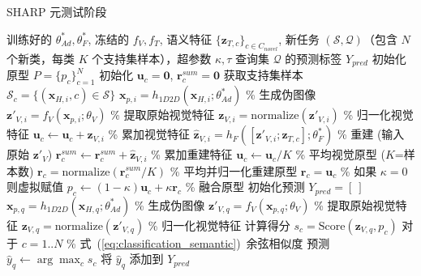 \begin{algorithm}[htbp]
\caption{SHARP 元测试阶段}
\label{alg:fsl_testing_sharp}
\begin{algorithmic}[1]
\REQUIRE 训练好的 $\theta_{Ad}^*, \theta_F^*$, 冻结的 $f_V, f_T$, 语义特征 $\{\mathbf{z}_{T,c}\}_{c \in C_{novel}}$, 新任务 $(\mathcal{S}, \mathcal{Q})$（包含 $N$ 个新类，每类 $K$ 个支持集样本），超参数 $\kappa, \tau$
\ENSURE 查询集 $\mathcal{Q}$ 的预测标签 $Y_{pred}$
\STATE 初始化原型 $P = \{ p_c \}_{c=1}^N$
    \STATE 初始化 $\mathbf{u}_c=\mathbf{0}$, $\mathbf{r}_c^{sum}=\mathbf{0}$
    \STATE 获取支持集样本 $\mathcal{S}_c = \{(\mathbf{x}_{H,i}, c) \in \mathcal{S}\}$
        \STATE $\mathbf{x}_{p,i} = h_{1D2D}(\mathbf{x}_{H,i}; \theta_{Ad}^*)$ \% 生成伪图像
        \STATE $\mathbf{z}'_{V,i} = f_V(\mathbf{x}_{p,i}; \theta_V)$          \% 提取原始视觉特征
        \STATE $\mathbf{z}_{V,i} = \text{normalize}(\mathbf{z}'_{V,i})$           \% 归一化视觉特征
        \STATE $\mathbf{u}_c \leftarrow \mathbf{u}_c + \mathbf{z}_{V,i}$             \% 累加视觉特征
            \STATE $\hat{\mathbf{z}}_{V,i} = h_F([\mathbf{z}'_{V,i}; \mathbf{z}_{T,c}]; \theta_F^*)$ \% 重建 (输入原始 $\mathbf{z}'_V$)
            \STATE $\mathbf{r}_c^{sum} \leftarrow \mathbf{r}_c^{sum} + \hat{\mathbf{z}}_{V,i}$ \% 累加重建特征
        \ENDIF
    \ENDFOR %
    \STATE $\mathbf{u}_c \leftarrow \mathbf{u}_c / K$                     \% 平均视觉原型 ($K$=样本数)
        \STATE $\mathbf{r}_c = \text{normalize}(\mathbf{r}_c^{sum} / K)$       \% 平均并归一化重建原型
    \ELSE
        \STATE $\mathbf{r}_c = \mathbf{u}_c$                           \% 如果 $\kappa=0$ 则虚拟赋值
    \ENDIF
    \STATE $p_c \leftarrow (1 - \kappa) \mathbf{u}_c + \kappa \mathbf{r}_c$   \% 融合原型
\ENDFOR %
\STATE 初始化预测 $Y_{pred} = [~]$
    \STATE $\mathbf{x}_{p,q} = h_{1D2D}(\mathbf{x}_{H,q}; \theta_{Ad}^*)$  \% 生成伪图像
    \STATE $\mathbf{z}'_{V,q} = f_V(\mathbf{x}_{p,q}; \theta_V)$           \% 提取原始视觉特征
    \STATE $\mathbf{z}_{V,q} = \text{normalize}(\mathbf{z}'_{V,q})$            \% 归一化视觉特征
\STATE 计算得分 $s_c = \text{Score}(\mathbf{z}_{V,q}, p_c)$ 对于 $c=1..N$ \% 式~(\ref{eq:classification_semantic})~余弦相似度
    \STATE 预测 $\hat{y}_q \leftarrow \arg\max_{c} s_c$
    \STATE 将 $\hat{y}_q$ 添加到 $Y_{pred}$
\ENDFOR %
\end{algorithmic}
\end{algorithm}

